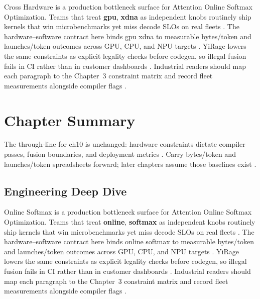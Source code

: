 Cross Hardware is a production bottleneck surface for Attention Online Softmax Optimization. Teams that treat \textbf{gpu}, \textbf{xdna} as independent knobs routinely ship kernels that win microbenchmarks yet miss decode SLOs on real fleets \citep{nvidia2022hopper,amd2024aie}. The hardware--software contract here binds gpu xdna to measurable bytes/token and launches/token outcomes across GPU, CPU, and NPU targets \citep{semianalysis2024tma,dlbook}. YiRage lowers the same constraints as explicit legality checks before codegen, so illegal fusion fails in CI rather than in customer dashboards \citep{amd2024xdna,dao2022flashattention}. Industrial readers should map each paragraph to the Chapter~3 constraint matrix and record fleet measurements alongside compiler flags \citep{amd2024aie,kwon2023vllm}.

\section{Chapter Summary}
\label{sec:ch10_summary}

The through-line for ch10 is unchanged: hardware constraints dictate compiler passes, fusion boundaries, and deployment metrics \citep{memoryfloor2026,amd2024xdna}. Carry bytes/token and launches/token spreadsheets forward; later chapters assume those baselines exist \citep{semianalysis2024tma,dlbook}.


\subsection{Engineering Deep Dive}
\label{sec:ch10_deep_dive}

Online Softmax is a production bottleneck surface for Attention Online Softmax Optimization. Teams that treat \textbf{online}, \textbf{softmax} as independent knobs routinely ship kernels that win microbenchmarks yet miss decode SLOs on real fleets \citep{semianalysis2024tma,dlbook}. The hardware--software contract here binds online softmax to measurable bytes/token and launches/token outcomes across GPU, CPU, and NPU targets \citep{amd2024xdna,dao2022flashattention}. YiRage lowers the same constraints as explicit legality checks before codegen, so illegal fusion fails in CI rather than in customer dashboards \citep{amd2024aie,kwon2023vllm}. Industrial readers should map each paragraph to the Chapter~3 constraint matrix and record fleet measurements alongside compiler flags \citep{dlbook,nvidia2024cudagraphs}.

